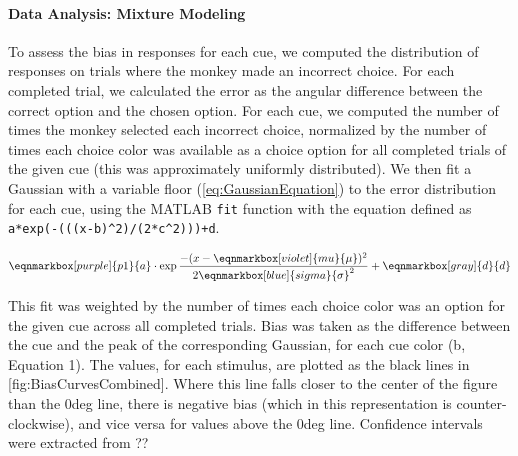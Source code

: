 \paragraph{Data Analysis: Mixture Modeling}\label{para:MixtureModeling}

To assess the bias in responses for each cue, we computed the distribution of responses on trials where the monkey made an incorrect choice. For each completed trial, we calculated the error as the angular difference between the correct option and the chosen option. For each cue, we computed the number of times the monkey selected each incorrect choice, normalized by the number of times each choice color was available as a choice option for all completed trials of the given cue (this was approximately uniformly distributed). 
We then fit a Gaussian with a variable floor (\autoref{eq:GaussianEquation}) to the error distribution for each cue, using the MATLAB \lstinline{fit} function with the equation defined as \lstinline{a*exp(-(((x-b)^2)/(2*c^2)))+d}. 



\vspace{2em} 
\begin{equation} \label{eq:GaussianEquation}
    \eqnmarkbox[purple]{p1}{a}
    \cdot
    \exp
    \frac{-(x-
    \eqnmarkbox[violet]{mu}{\mu}
    )^2}{2 
    \eqnmarkbox[blue]{sigma}{\sigma}^2}
    +
    \eqnmarkbox[gray]{d}{d}        
\end{equation}

\vspace{2em} 

This fit was weighted by the number of times each choice color was an option for the given cue across all completed trials. Bias was taken as the difference between the cue and the peak of the corresponding Gaussian, for each cue color (b, Equation 1). The values, for each stimulus, are plotted as the black lines in [fig:BiasCurvesCombined]. Where this line falls closer to the center of the figure than the 0deg line, there is negative bias (which in this representation is counter-clockwise), and vice versa for values above the 0deg line. Confidence intervals were extracted from ??

